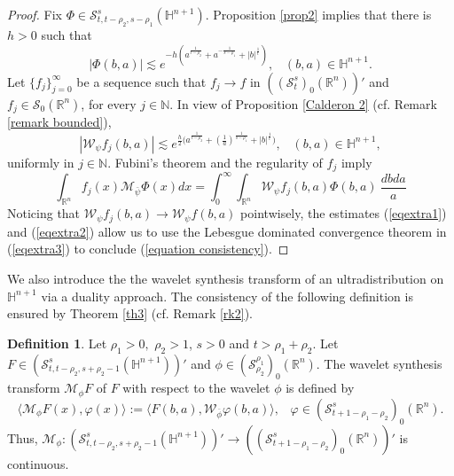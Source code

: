 \documentclass[reqno,12pt]{amsart}
\theoremstyle{plain}
\theoremstyle{definition}
\newtheorem{definition}{Definition}
\theoremstyle{remark}
\begin{document}
\begin{proof}
Fix $\Phi \in {\mathcal S}^s_{t, t - \rho_2, s-\rho_1}(\mathbb{H}^{n+1})$. Proposition \ref{prop2} implies that there is $h>0$ such that
\begin{equation}
\label{eqextra1}
|\Phi(b,a)|\lesssim e^{-h\left(a^{\frac{1}{t-\rho_{2}}} +
a^{-\frac{1}{s-\rho_1}} + |b|^{\frac{1}{t}} \right)}, \;\;\; (b,a) \in \mathbb{H}^{n+1}.
\end{equation}
Let $\{f_{j}\}_{j=0}^{\infty}$ be a sequence such that $f_j\to f$ in $(({\mathcal S}^s_{t} )_0 (\mathbb{R}^n))'$ and $f_{j}\in \mathcal{S}_{0}(\mathbb{R}^{n})$, for every $j\in\mathbb{N}$. In view of Proposition \ref{Calderon 2} (cf. Remark \ref{remark bounded}),
\begin{equation}
\label{eqextra2}
|{\mathcal W}_{\psi} f_{j}(b, a)| \lesssim
 e^{\frac{h}{2} \big(  a^{\frac{1}{t - {\rho_2}}} + (\frac{1}{a})^{\frac{1}{s - {\rho_1}}}
+ |b|^{\frac{1}{t}}  \big)}, \;\;\; (b,a) \in \mathbb{H}^{n+1},
\end{equation}
uniformly in $j\in\mathbb{N}$. Fubini's theorem and the regularity of $f_{j}$ imply
\begin{equation}
\label{eqextra3}
\int_{\mathbb{R}^{n}}f_{j}(x) {\mathcal M}_{\bar{\psi}} \Phi (x) dx= \int_{0}^{\infty}\int_{\mathbb{R}^{n}}\mathcal{W}_{\psi}f_{j}(b,a)\Phi(b,a)\:\frac{dbda}{a}
\end{equation}
Noticing that $\mathcal{W}_{\psi}f_{j}(b,a)\to\mathcal{W}_{\psi} f(b,a) $ pointwisely,
the estimates (\ref{eqextra1}) and (\ref{eqextra2}) allow us to use the Lebesgue dominated convergence theorem in (\ref{eqextra3}) to conclude (\ref{equation consistency}).
\end{proof}

\par

We also introduce the the wavelet synthesis transform of an ultradistribution on $\mathbb{H}^{n+1}$ via a duality approach. The consistency of the following definition is ensured by Theorem \ref{th3} (cf. Remark \ref{rk2}).

\begin{definition} \label{def2}
Let  $ \rho_1 > 0,$ $ \rho_2 > 1 $, $s > 0$ and $ t > \rho_1 + \rho_2 $.
Let $ F \in ({\mathcal S}^s _{t, t - \rho_2, s+\rho_2 -1 }
(\mathbb{H}^{n+1}))' $
and $ \phi \in (\mathcal{S} ^{\rho_1 } _{\rho_2})_0 (\mathbb{R}^n) $.
The wavelet
synthesis transform $ {\mathcal M}_{\phi} F$ of $ F $ with respect
to the wavelet $ \phi $  is defined by
$$
\langle {\mathcal M}_{\phi} F(x), \varphi (x) \rangle := \langle
F(b, a), {\mathcal W}_{\overline{\phi}} \varphi (b, a) \rangle,
\;\;\; \varphi \in ({\mathcal S}^s _{t+1 - \rho_1 -\rho_2})_0 (\mathbb{R}^n).
$$
Thus, $ {\mathcal M}_{\phi} : ({\mathcal S}^s _{t, t - \rho_2, s+\rho_2 -1 }
(\mathbb{H}^{n+1}))' \to (({\mathcal S}^s _{t+1 - \rho_1 -\rho_2})_0 (\mathbb{R}^n))'$ is continuous.
\end{definition}
\end{document}
